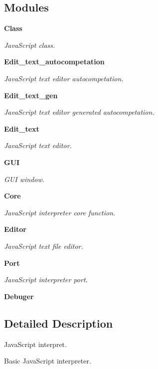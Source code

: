 \subsection*{Modules}
\begin{DoxyCompactItemize}
\item 
\textbf{ Class}
\begin{DoxyCompactList}\small\item\em Java\+Script class. \end{DoxyCompactList}\item 
\textbf{ Edit\+\_\+text\+\_\+autocompetation}
\begin{DoxyCompactList}\small\item\em Java\+Script text editor autocompetation. \end{DoxyCompactList}\item 
\textbf{ Edit\+\_\+text\+\_\+gen}
\begin{DoxyCompactList}\small\item\em Java\+Script text editor generated autocompetation. \end{DoxyCompactList}\item 
\textbf{ Edit\+\_\+text}
\begin{DoxyCompactList}\small\item\em Java\+Script text editor. \end{DoxyCompactList}\item 
\textbf{ G\+UI}
\begin{DoxyCompactList}\small\item\em G\+UI window. \end{DoxyCompactList}\item 
\textbf{ Core}
\begin{DoxyCompactList}\small\item\em Java\+Script interpreter core function. \end{DoxyCompactList}\item 
\textbf{ Editor}
\begin{DoxyCompactList}\small\item\em Java\+Script text file editor. \end{DoxyCompactList}\item 
\textbf{ Port}
\begin{DoxyCompactList}\small\item\em Java\+Script interpreter port. \end{DoxyCompactList}\item 
\textbf{ Debuger}
\end{DoxyCompactItemize}


\subsection{Detailed Description}
Java\+Script interpret. 

Basic Java\+Script interpreter.